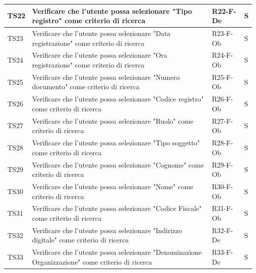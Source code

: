 \documentclass[a4paper,12pt]{article}
\begin{document}
\begin{longtable}{|M{1.2cm}|M{6.3cm}|M{2.5cm}|M{1.5cm}|}
                TS22 & Verificare che l'utente possa selezionare "Tipo registro" come criterio di ricerca & R22-F-De & S \\
                \hline
               
                TS23 & Verificare che l'utente possa selezionare "Data registrazione" come criterio di ricerca & R23-F-Ob & S \\
                \hline
                
                TS24 & Verificare che l'utente possa selezionare "Ora registrazione" come criterio di ricerca & R24-F-Ob & S \\
                \hline
                
                TS25 & Verificare che l'utente possa selezionare "Numero documento" come criterio di ricerca & R25-F-Ob & S \\
                \hline

                TS26 & Verificare che l'utente possa selezionare "Codice registro" come criterio di ricerca & R26-F-Ob & S \\
                \hline

                TS27 & Verificare che l'utente possa selezionare "Ruolo" come criterio di ricerca & R27-F-Ob & S \\
                \hline

                TS28 & Verificare che l'utente possa selezionare "Tipo soggetto" come criterio di ricerca & R28-F-Ob & S \\
                \hline

                TS29 & Verificare che l'utente possa selezionare "Cognome" come criterio di ricerca & R29-F-Ob & S \\
                \hline

                TS30 & Verificare che l'utente possa selezionare "Nome" come criterio di ricerca & R30-F-Ob & S \\
                \hline

                TS31 & Verificare che l'utente possa selezionare "Codice Fiscale" come criterio di ricerca & R31-F-Ob & S \\
                \hline

                TS32 & Verificare che l'utente possa selezionare "Indirizzo digitale" come criterio di ricerca & R32-F-De & S \\
                \hline

                TS33 & Verificare che l'utente possa selezionare "Denominazione Organizzazione" come criterio di ricerca & R33-F-De & S \\
                \hline


\end{longtable}
\end{document}
